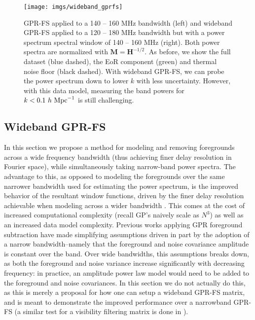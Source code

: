 \documentclass[a4paper,fleqn,usenatbib]{mnras}
\def\H{\boldsymbol{H}}
\def\M{\boldsymbol{M}}
\begin{document}
\begin{figure}
\centering
\texttt{[image: imgs/wideband\_gprfs]}
\caption{GPR-FS applied to a 140 -- 160 MHz bandwidth (left) and wideband GPR-FS applied to a 120 -- 180 MHz bandwidth but with a power spectrum spectral window of 140 -- 160 MHz (right).
Both power spectra are normalized with $\M=\H^{-1/2}$.
As before, we show the full dataset (blue dashed), the EoR component (green) and thermal noise floor (black dashed).
With wideband GPR-FS, we can probe the power spectrum down to lower $k$ with less uncertainty.
However, with this data model, measuring the band powers for $k < 0.1\ h\ {\rm Mpc}^{-1}$ is still challenging.}
\label{fig:wideband_gprfs}
\end{figure}


\subsection{Wideband GPR-FS}
\label{sec:wideband_gpr}

In this section we propose a method for modeling and removing foregrounds across a wide frequency bandwidth (thus achieving finer delay resolution in Fourier space), while simultaneously taking narrow-band power spectra.
The advantage to this, as opposed to modeling the foregrounds over the same narrower bandwidth used for estimating the power spectrum, is the improved behavior of the resultant window functions, driven by the finer delay resolution achievable when modeling across a wider bandwidth \citep{Parsons2014}.
This comes at the cost of increased computational complexity (recall GP's naively scale as $N^3$) as well as an increased data model complexity.
Previous works applying GPR foreground subtraction have made simplifying assumptions driven in part by the adoption of a narrow bandwidth--namely that the foreground and noise covariance amplitude is constant over the band.
Over wide bandwidths, this assumptions breaks down, as both the foreground and noise variance increase significantly with decreasing frequency: in practice, an amplitude power law model would need to be added to the foreground and noise covariances.
In this section we do not actually do this, as this is merely a proposal for how one can setup a wideband GPR-FS matrix, and is meant to demonstrate the improved performance over a narrowband GPR-FS (a similar test for a visibility filtering matrix is done in \citet{Ewall-Wice2020}).
\end{document}
